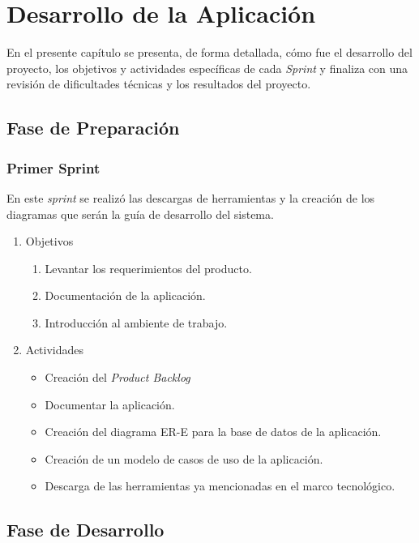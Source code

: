 \chapter{Desarrollo de la Aplicación}
\label{desarrollo-capitulo}

En el presente capítulo se presenta, de forma detallada, cómo fue el desarrollo del proyecto, los objetivos y actividades específicas de cada \textit{Sprint} y finaliza con una revisión de dificultades técnicas y los resultados del proyecto.

\section{Fase de Preparación}
    \subsection{Primer Sprint}
    
    En este \textit{sprint} se realizó las descargas de herramientas y la creación de los diagramas que serán la guía de desarrollo del sistema.
    
    \begin{enumerate}
        \item Objetivos
        \begin{enumerate}
            \item Levantar los requerimientos del producto.
            \item Documentación de la aplicación.
            \item Introducción al ambiente de trabajo.
        \end{enumerate}
        \item Actividades
        \begin{itemize}
            \item Creación del \textit{Product Backlog}
            \item Documentar la aplicación.
            \item Creación del diagrama ER-E para la base de datos de la aplicación.
            \item Creación de un modelo de casos de uso de la aplicación.
            \item Descarga de las herramientas ya mencionadas en el marco tecnológico.
        \end{itemize}
    \end{enumerate}
        
\section{Fase de Desarrollo}
    
